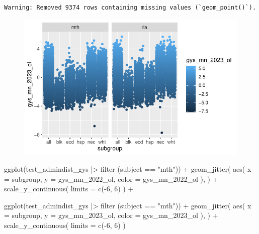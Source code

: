 \documentclass[
  letterpaper,
  DIV=11,
  numbers=noendperiod]{scrartcl}
\newenvironment{Shaded}{\begin{snugshade}}{\end{snugshade}}
\newcommand{\AttributeTok}[1]{\textcolor[rgb]{0.40,0.45,0.13}{#1}}
\newcommand{\DecValTok}[1]{\textcolor[rgb]{0.68,0.00,0.00}{#1}}
\newcommand{\FunctionTok}[1]{\textcolor[rgb]{0.28,0.35,0.67}{#1}}
\newcommand{\NormalTok}[1]{\textcolor[rgb]{0.00,0.23,0.31}{#1}}
\newcommand{\SpecialCharTok}[1]{\textcolor[rgb]{0.37,0.37,0.37}{#1}}
\newcommand{\StringTok}[1]{\textcolor[rgb]{0.13,0.47,0.30}{#1}}
\begin{document}
\begin{verbatim}
Warning: Removed 9374 rows containing missing values (`geom_point()`).
\end{verbatim}

\begin{figure}[H]

{\centering \includegraphics{GeospatialMapping_files/figure-pdf/district-scores-scatter-2.pdf}

}

\end{figure}

\begin{Shaded}
\begin{Highlighting}[]
\FunctionTok{ggplot}\NormalTok{(test\_admindist\_gys }\SpecialCharTok{|\textgreater{}} \FunctionTok{filter}\NormalTok{ (subject }\SpecialCharTok{==} \StringTok{"mth"}\NormalTok{)) }\SpecialCharTok{+}
  \FunctionTok{geom\_jitter}\NormalTok{(}
    \FunctionTok{aes}\NormalTok{(}
      \AttributeTok{x =}\NormalTok{ subgroup,}
      \AttributeTok{y =}\NormalTok{ gys\_mn\_2022\_ol,}
      \AttributeTok{color =}\NormalTok{ gys\_mn\_2022\_ol}
\NormalTok{      ),}
\NormalTok{    ) }\SpecialCharTok{+}
  \FunctionTok{scale\_y\_continuous}\NormalTok{(}
    \AttributeTok{limits =} \FunctionTok{c}\NormalTok{(}\SpecialCharTok{{-}}\DecValTok{6}\NormalTok{, }\DecValTok{6}\NormalTok{)}
\NormalTok{  ) }\SpecialCharTok{+}

\FunctionTok{ggplot}\NormalTok{(test\_admindist\_gys }\SpecialCharTok{|\textgreater{}} \FunctionTok{filter}\NormalTok{ (subject }\SpecialCharTok{==} \StringTok{"mth"}\NormalTok{)) }\SpecialCharTok{+}
  \FunctionTok{geom\_jitter}\NormalTok{(}
    \FunctionTok{aes}\NormalTok{(}
      \AttributeTok{x =}\NormalTok{ subgroup,}
      \AttributeTok{y =}\NormalTok{ gys\_mn\_2023\_ol,}
      \AttributeTok{color =}\NormalTok{ gys\_mn\_2023\_ol}
\NormalTok{      ),}
\NormalTok{    ) }\SpecialCharTok{+}
  \FunctionTok{scale\_y\_continuous}\NormalTok{(}
    \AttributeTok{limits =} \FunctionTok{c}\NormalTok{(}\SpecialCharTok{{-}}\DecValTok{6}\NormalTok{, }\DecValTok{6}\NormalTok{)}
\NormalTok{  )}
\end{Highlighting}
\end{Shaded}
\end{document}
